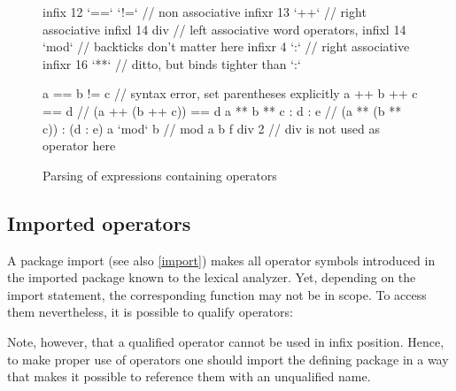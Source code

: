 \begin{figure}
\begin{code}

infix 12 `==` `!=`       // non associative
infixr 13 `++`           // right associative
infixl 14 div            // left associative word operators, 
infixl 14 `mod`          //  backticks don't matter here
infixr 4 `:`             // right associative
infixr 16 `**`           // ditto, but binds tighter than `:`

a == b != c              // syntax error, set parentheses explicitly
a ++ b ++ c  == d        // (a ++ (b ++ c)) == d
a ** b ** c : d : e      // (a ** (b ** c)) : (d : e)
a `mod` b                // mod a b
f div 2                  // div is not used as operator here
\end{code}
\caption{Parsing of expressions containing operators} \label{exprparse}
\end{figure}

\subsection{Imported operators} \label{importedops}

A package import (see also \autoref{import}) makes all operator symbols introduced in the imported package known to the lexical analyzer. Yet, depending on the import statement, the corresponding function may not be in scope. To access them nevertheless, it is possible to qualify operators:

\begin{flushleft}
   \oder{}   
\end{flushleft}

Note, however, that a qualified operator cannot be used in infix position. Hence, to make proper use of operators one should import the defining package in a way that makes it possible to reference them with an unqualified name.


